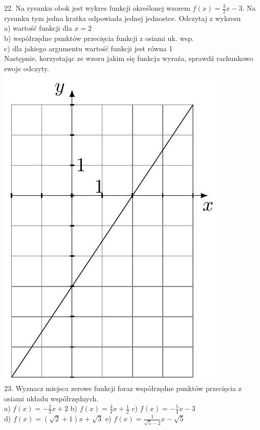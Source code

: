 \documentclass[10pt]{article}
\begin{document}
22. Na rysunku obok jest wykres funkcji określonej wzorem \(f(x)=\frac{3}{2} x-3\). Na rysunku tym jedna kratka odpowiada jednej jednostce. Odczytaj z wykresu\\
a) wartość funkcji dla \(x=2\)\\
b) współrzędne punktów przecięcia funkcji z osiami uk. wsp.\\
c) dla jakiego argumentu wartość funkcji jest równa 1\\
Następnie, korzystając ze wzoru jakim się funkcja wyraża, sprawdź rachunkowo swoje odczyty.\\
\includegraphics[max width=\textwidth, center]{2024_11_21_e9b4faa005d5be2cc318g-131(1)}\\
23. Wyznacz miejsca zerowe funkcji foraz współrzędne punktów przecięcia z osiami układu współrzędnych.\\
a) \(f(x)=-\frac{2}{3} x+2\) b) \(f(x)=\frac{3}{4} x+\frac{1}{2}\) c) \(f(x)=-\frac{5}{4} x-3\)\\
d) \(f(x)=(\sqrt{2}+1) x+\sqrt{3}\) e) \(f(x)=\frac{1}{\sqrt{5}-2} x-\sqrt{5}\)
\end{document}

